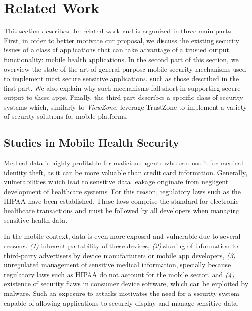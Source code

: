 
% 
% 
\section{Related Work}
\label{sec:relatedWork}

This section describes the related work and is organized in three main parts. First, in order to better motivate our proposal, we discuss the existing security issues of a class of applications that can take advantage of a trusted output functionality: mobile health applications.
In the second part of this section, we overview the state of the art of general-purpose mobile security mechanisms used to implement most secure sensitive applications, such as those described in the first part. We also explain why such mechanisms fall short in supporting secure output to these apps.
Finally, the third part describes a specific class of security systems which, similarly to \emph{ViewZone}, leverage TrustZone to implement a variety of security solutions for mobile platforms.

\subsection{Studies in Mobile Health Security}
\label{sec:mhealth}

Medical data is highly profitable for malicious agents who can use it for medical identity theft, as it can be more valuable than credit card information. Generally, vulnerabilities which lead to sensitive data leakage originate from negligent development of healthcare systems. For this reason, regulatory laws such as the \ac{HIPAA} have been established. These laws comprise the standard for electronic healthcare transactions and must be followed by all developers when managing sensitive health data.

In the mobile context, data is even more exposed and vulnerable due to several reasons: \emph{(1)} inherent portability of these devices, \emph{(2)} sharing of information to third-party advertisers by device manufacturers or mobile app developers, \emph{(3)} unregulated management of sensitive medical information, specially because regulatory laws such as \ac{HIPAA} do not account for the mobile sector, and \emph{(4)} existence of security flaws in consumer device software, which can be exploited by malware. Such an exposure to attacks motivates the need for a security system capable of allowing applications to securely display and manage sensitive data.

